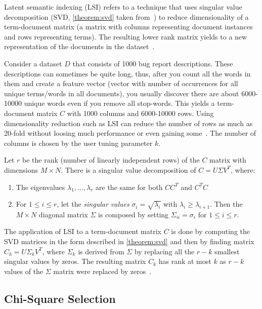 Latent semantic indexing (LSI) refers to a technique that uses singular value decomposition (SVD, \autoref{theorem:svd} taken from~\cite{manning2008introduction}) to reduce dimensionality of a term-document matrix (a matrix with columns representing document instances and rows representing terms). The resulting lower rank matrix yields to a new representation of the documents in the dataset~\cite{manning2008introduction}.

Consider a dataset $D$ that consists of 1000 bug report descriptions. These descriptions can sometimes be quite long, thus, after you count all the words in them and create a feature vector (vector with number of occurrences for all unique terms/words in all documents), you usually discover there are about 6000-10000 unique words even if you remove all stop-words. This yields a term-document matrix $C$ with 1000 columns and 6000-10000 rows. Using dimensionality reduction such as LSI can reduce the number of rows as much as 20-fold without loosing much performance or even gaining some~\cite{Ahsan2009}. The number of columns is chosen by the user tuning parameter $k$.

\begin{theorem}
\label{theorem:svd}
Let $r$ be the rank (number of linearly independent rows) of the $C$ matrix with dimensions $M \times N$. There is a singular value decomposition of $C = U \Sigma V^T$, where:
\begin{enumerate}
    \item The eigenvalues $\lambda_1,...,\lambda_r$ are the same for both $CC^T$ and $C^TC$
    \item For $1 \leq i \leq r$, let the \textit{singular values} $\sigma_i = \sqrt{\lambda_i}$ with $\lambda_i \geq \lambda_{i+1}$. Then the $M \times N$ diagonal matrix $\Sigma$ is composed by setting $\Sigma_{ii} = \sigma_i$ for $1 \leq i \leq r$.
\end{enumerate}
\end{theorem}

The application of LSI to a term-document matrix $C$ is done by computing the SVD matrices in the form described in \autoref{theorem:svd} and then by finding matrix $C_k = U \Sigma_k V^T$, where $\Sigma_k$ is derived from $\Sigma$ by replacing all the $r-k$ smallest singular values by zeros. The resulting matrix $C_k$ has rank at most $k$ as $r-k$ values of the $\Sigma$ matrix were replaced by zeros~\cite{manning2008introduction}.

\subsection{Chi-Square Selection}

